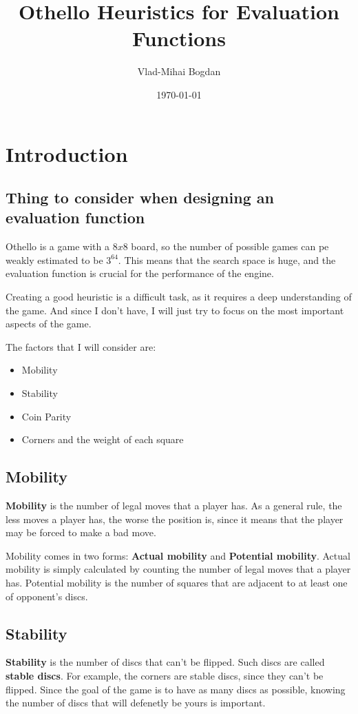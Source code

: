 \documentclass{article}
\title{Othello Heuristics for Evaluation Functions}
\author{Vlad-Mihai Bogdan}
\date{\today}
\begin{document}
\maketitle

\section*{Introduction}
\subsection*{Thing to consider when designing an evaluation function}

\quad Othello is a game with a $8 x 8$ board, so the number of possible games can pe weakly estimated to be $3^{64}$. 
This means that the search space is huge, and the evaluation function is crucial for the performance of the engine.

Creating a good heuristic is a difficult task, as it requires a deep understanding of the game. 
And since I don't have, I will just try to focus on the most important aspects of the game.

The factors that I will consider are:
\begin{itemize}
  \item Mobility
  \item Stability
  \item Coin Parity
  \item Corners and the weight of each square
\end{itemize}

\subsection*{Mobility}
\quad \textbf{Mobility} is the number of legal moves that a player has. 
As a general rule, the less moves a player has, the worse the position is, since it means that the player may be forced to make a bad move.

Mobility comes in two forms: \textbf{Actual mobility} and \textbf{Potential mobility}. 
Actual mobility is simply calculated by counting the number of legal moves that a player has.
Potential mobility is the number of squares that are adjacent to at least one of opponent's discs.

\subsection*{Stability}
\quad \textbf{Stability} is the number of discs that can't be flipped. 
Such discs are called \textbf{stable discs}. For example, the corners are stable discs, since they can't be flipped.
Since the goal of the game is to have as many discs as possible, knowing the number of discs that will defenetly be yours is important.
\end{document}
